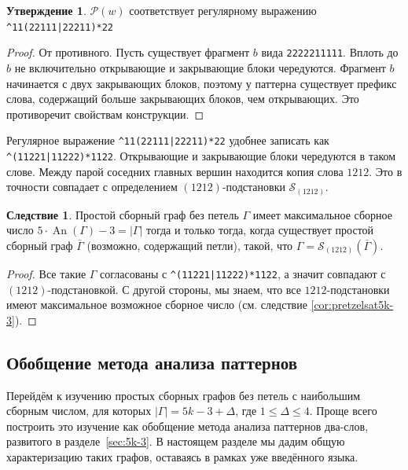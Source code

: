 \documentclass{article}
\theoremstyle{definition}
\newtheorem{conjecture}[theorem]{Утверждение}
\newtheorem{corollary}[theorem]{Следствие}
\newcommand{\An}{\operatorname{An}}
\newcommand{\pattern}{\mathcal{P}}
\newcommand{\D}{\Delta}
\begin{document}
\begin{conjecture}
    \(\pattern(w)\) соответствует регулярному выражению \texttt{\^{}11(22111|22211)*22}
\end{conjecture}

\begin{proof}
    От противного. Пусть существует фрагмент \(b\) вида \texttt{2222211111}. Вплоть до \(b\) не включительно открывающие и закрывающие блоки чередуются. Фрагмент \(b\) начинается с двух закрывающих блоков, поэтому у паттерна существует префикс слова, содержащий больше закрывающих блоков, чем открывающих. Это противоречит свойствам конструкции.
\end{proof}

Регулярное выражение \texttt{\^{}11(22111|22211)*22} удобнее записать как \texttt{\^{}(11221|11222)*1122}. Открывающие и закрывающие блоки чередуются в таком слове. Между парой соседних главных вершин находится копия слова \(1212\). 
Это в точности совпадает с определением \((1212)\)-подстановки \(\mathcal{S}_{(1212)}\). 

\begin{corollary}
    Простой сборный граф без петель \(\Gamma\) имеет максимальное сборное число \(5\cdot \An(\Gamma) - 3 = |\Gamma|\) тогда и только тогда, когда существует простой сборный граф \(\bar{\Gamma}\) (возможно, содержащий петли), такой, что \(\Gamma = \mathcal{S}_{(1212)}(\bar{\Gamma})\).
\end{corollary}

\begin{proof}
    Все такие \(\Gamma\) согласованы с \texttt{\^{}(11221|11222)*1122}, а значит совпадают с \((1212)\)-подстановкой. С другой стороны, мы знаем, что все \(1212\)-подстановки имеют максимальное возможное сборное число (см. следствие \ref{cor:pretzelsat5k-3}).
\end{proof}

\subsection{Обобщение метода анализа паттернов}\label{sec:description}

Перейдём к изучению простых сборных графов без петель с наибольшим 
сборным числом, для которых \(|\Gamma| = 5k - 3 + \D\), где 
\(1 \leq \D \leq 4\). Проще всего построить это изучение как 
обобщение метода анализа паттернов два-слов, развитого в 
разделе~\ref{sec:5k-3}. В настоящем разделе мы дадим общую 
характеризацию таких графов, оставаясь в рамках уже введённого языка.
\end{document}

